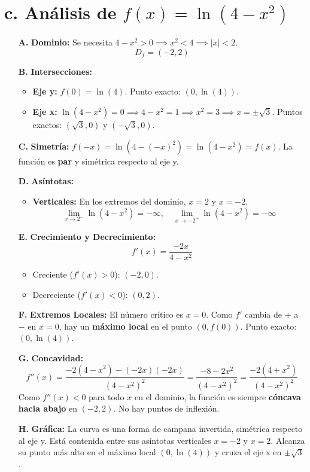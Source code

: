 \documentclass[12pt, letterpaper]{article}
\begin{document}
\section*{c. Análisis de $f(x) = \ln(4-x^2)$}
\begin{enumerate}
    \item[\textbf{A.}] \textbf{Dominio:} Se necesita $4-x^2 > 0 \implies x^2 < 4 \implies |x| < 2$.
    $$ D_f = (-2, 2) $$

    \item[\textbf{B.}] \textbf{Intersecciones:}
    \begin{itemize}
        \item \textbf{Eje y:} $f(0) = \ln(4)$. Punto exacto: $(0, \ln(4))$.
        \item \textbf{Eje x:} $\ln(4-x^2) = 0 \implies 4-x^2 = 1 \implies x^2 = 3 \implies x = \pm\sqrt{3}$. Puntos exactos: $(\sqrt{3}, 0)$ y $(-\sqrt{3}, 0)$.
    \end{itemize}
    
    \item[\textbf{C.}] \textbf{Simetría:} $f(-x) = \ln(4-(-x)^2) = \ln(4-x^2) = f(x)$. La función es \textbf{par} y simétrica respecto al eje y.

    \item[\textbf{D.}] \textbf{Asíntotas:}
    \begin{itemize}
        \item \textbf{Verticales:} En los extremos del dominio, $x=2$ y $x=-2$.
        $$ \lim_{x\to2^-} \ln(4-x^2) = -\infty, \quad \lim_{x\to-2^+} \ln(4-x^2) = -\infty $$
    \end{itemize}

    \item[\textbf{E.}] \textbf{Crecimiento y Decrecimiento:}
    $$ f'(x) = \frac{-2x}{4-x^2} $$
    \begin{itemize}
        \item Creciente ($f'(x)>0$): $(-2, 0)$.
        \item Decreciente ($f'(x)<0$): $(0, 2)$.
    \end{itemize}

    \item[\textbf{F.}] \textbf{Extremos Locales:} El número crítico es $x=0$. Como $f'$ cambia de $+$ a $-$ en $x=0$, hay un \textbf{máximo local} en el punto $(0, f(0))$. Punto exacto: $(0, \ln(4))$.

    \item[\textbf{G.}] \textbf{Concavidad:}
    $$ f''(x) = \frac{-2(4-x^2) - (-2x)(-2x)}{(4-x^2)^2} = \frac{-8-2x^2}{(4-x^2)^2} = \frac{-2(4+x^2)}{(4-x^2)^2} $$
    Como $f''(x) < 0$ para todo $x$ en el dominio, la función es siempre \textbf{cóncava hacia abajo} en $(-2, 2)$. No hay puntos de inflexión.

    \item[\textbf{H.}] \textbf{Gráfica:} La curva es una forma de campana invertida, simétrica respecto al eje y. Está contenida entre sus asíntotas verticales $x=-2$ y $x=2$. Alcanza su punto más alto en el máximo local $(0, \ln(4))$ y cruza el eje x en $\pm\sqrt{3}$.
\end{enumerate}
\end{document}
